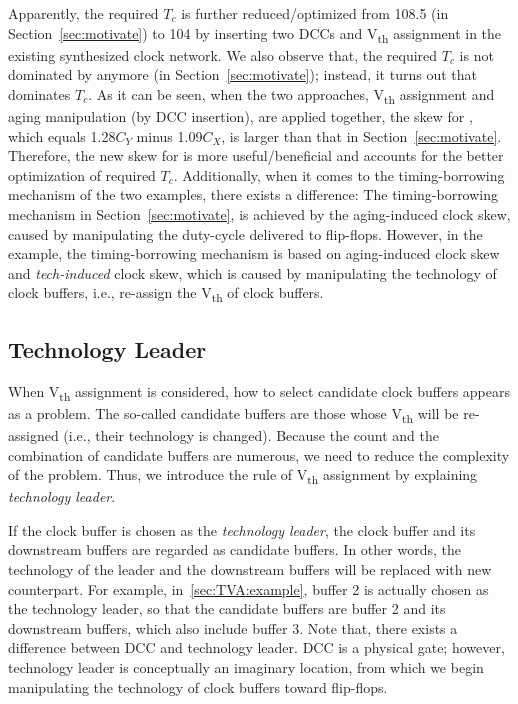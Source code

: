Apparently, the required $T_c$ is further reduced/optimized from 108.5 (in Section~\ref{sec:motivate}) to 104 by inserting two DCCs and V\textsubscript{th} assignment in the existing synthesized clock network. We also observe that, the required $T_c$ is not dominated by  anymore (in Section~\ref{sec:motivate}); instead, it turns out that  dominates $T_c$. As it can be seen, when the two approaches, V\textsubscript{th} assignment and aging manipulation  (by DCC insertion), are applied together, the skew for , which equals 1.28$C_Y$ minus 1.09$C_X$, is larger than that in Section~\ref{sec:motivate}. Therefore, the new skew for  is more useful/beneficial and accounts for the better optimization of required $T_c$. 
Additionally, when it comes to the timing-borrowing mechanism of the two examples, there exists a difference: The timing-borrowing mechanism in Section~\ref{sec:motivate}, is achieved by the aging-induced clock skew, caused by manipulating the duty-cycle delivered to flip-flops. However, in the example, the timing-borrowing mechanism is based on aging-induced clock skew and \textit{tech-induced} clock skew, which is caused by manipulating the technology of clock buffers, i.e., re-assign the V\textsubscript{th} of clock buffers. 

\subsection{Technology Leader}
\label{sec:TVA:leader}
When V\textsubscript{th} assignment is considered, how to select candidate clock buffers appears as a problem. The so-called candidate buffers are those whose V\textsubscript{th} will be re-assigned (i.e., their technology is changed). Because the count and the combination of candidate buffers are numerous, we need to reduce the complexity of the problem. Thus, we introduce the rule of V\textsubscript{th} assignment by explaining \textit{technology leader}. 

If the clock buffer is chosen as the \textit{technology leader}, the clock buffer and its downstream buffers are regarded as candidate buffers. In other words, the technology of the leader and the downstream buffers will be replaced with new counterpart. For example, in~\ref{sec:TVA:example}, buffer 2 is actually chosen as the technology leader, so that the candidate buffers are buffer 2 and its downstream buffers, which also include buffer 3. Note that, there exists a difference between DCC and technology leader. DCC is a physical gate; however, technology leader is conceptually an imaginary location, from which we begin manipulating the technology of clock buffers toward flip-flops.

